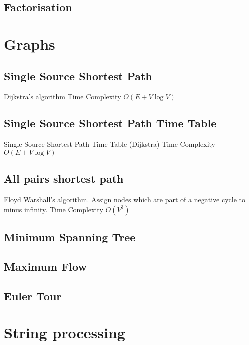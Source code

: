 \documentclass{article}
\begin{document}
\begin{multicols}{3}
\subsection{Factorisation}




\section{Graphs}

\subsection{Single Source Shortest Path}
Dijkstra's algorithm \newline
Time Complexity $O(E + V\log V)$


\subsection{Single Source Shortest Path Time Table}
Single Source Shortest Path Time Table (Dijkstra)  \newline
Time Complexity $O(E + V\log V)$


\subsection{All pairs shortest path}
Floyd Warshall's algorithm. Assign nodes which are part of a negative cycle to minus infinity. \newline
Time Complexity $O(V^3)$


\subsection{Minimum Spanning Tree}


\subsection{Maximum Flow}


\subsection{Euler Tour}


\section{String processing}

\end{multicols}
\end{document}
